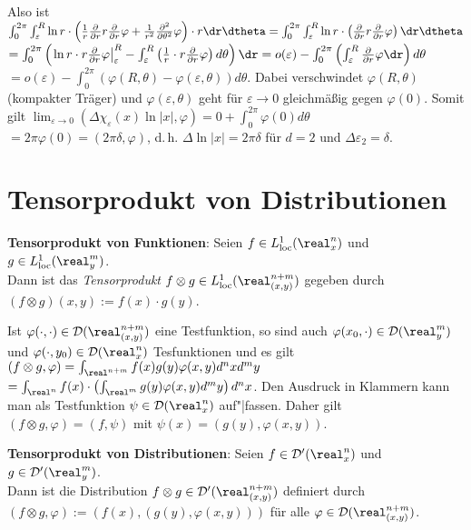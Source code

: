 Also ist
$\int_0^{2\pi} \int_\varepsilon^R
\ln r \cdot \left(\frac{1}{r} \frac{\partial}{\partial r} r
\frac{\partial}{\partial r} \varphi +
\frac{1}{r^2} \frac{\partial^2}{\partial \theta^2} \varphi\right) \cdot
r\dr\dtheta =
\int_0^{2\pi} \int_\varepsilon^R
\ln r \cdot \left(\frac{\partial}{\partial r} r
\frac{\partial}{\partial r} \varphi\right) \dr\dtheta$\\
$= \int_0^{2\pi} \left(\left.\ln r \cdot r
\frac{\partial}{\partial r} \varphi\right|_\varepsilon^R -
\int_\varepsilon^R \left(\frac{1}{r} \cdot
r \frac{\partial}{\partial r} \varphi\right)d\theta\right)\dr =
o(\varepsilon) - \int_0^{2\pi}
\left(\int_\varepsilon^R \frac{\partial}{\partial r}
\varphi \dr\right)d\theta$\\
$= o(\varepsilon) - \int_0^{2\pi}
\left(\varphi(R, \theta) - \varphi(\varepsilon, \theta)\right) d\theta$.
Dabei verschwindet $\varphi(R, \theta)$ (kompakter Träger) und
$\varphi(\varepsilon, \theta)$ geht für $\varepsilon \to 0$ gleichmäßig gegen
$\varphi(0)$.
Somit gilt
$\lim_{\varepsilon \to 0}
\left(\Delta \chi_\varepsilon(x)\ln |x|, \varphi\right) =
0 + \int_0^{2\pi} \varphi(0)d\theta$\\
$= 2\pi\varphi(0) = (2\pi\delta, \varphi)$,
d.\,h. $\Delta\ln|x| = 2\pi\delta$ für $d = 2$
und $\Delta \varepsilon_2 = \delta$.

\section{%
    Tensorprodukt von Distributionen%
}

\textbf{Tensorprodukt von Funktionen}:
Seien $f \in L^1_\loc(\real^n_x)$ und $g \in L^1_\loc(\real^m_y)$.\\
Dann ist das \emph{Tensorprodukt}
$f \otimes g \in L^1_\loc(\real^{n+m}_{(x,y)})$ gegeben durch
$(f \otimes g)(x, y) := f(x) \cdot g(y)$.

Ist $\varphi(\cdot, \cdot) \in \D(\real^{n+m}_{(x,y)})$
eine Testfunktion, so sind auch
$\varphi(x_0, \cdot) \in \D(\real^m_y)$ und
$\varphi(\cdot, y_0) \in \D(\real^n_x)$ Tesfunktionen und es gilt
$(f \otimes g, \varphi) = \int_{\real^{n+m}} f(x)g(y)\varphi(x, y)d^nxd^my$\\
$= \int_{\real^n} f(x) \cdot
\left(\int_{\real^m} g(y)\varphi(x, y)d^my\right)d^nx$.
Den Ausdruck in Klammern kann man als Testfunktion $\psi \in \D(\real^n_x)$
auf"|fassen.
Daher gilt $(f \otimes g, \varphi) = (f, \psi)$ mit
$\psi(x) = (g(y), \varphi(x, y))$.

\textbf{Tensorprodukt von Distributionen}:
Seien $f \in \D'(\real^n_x)$ und $g \in \D'(\real^m_y)$.\\
Dann ist die Distribution $f \otimes g \in \D'(\real^{n+m}_{(x,y)})$
definiert durch $(f \otimes g, \varphi) := (f(x), (g(y), \varphi(x, y)))$
für alle $\varphi \in \D(\real^{n+m}_{(x,y)})$.

